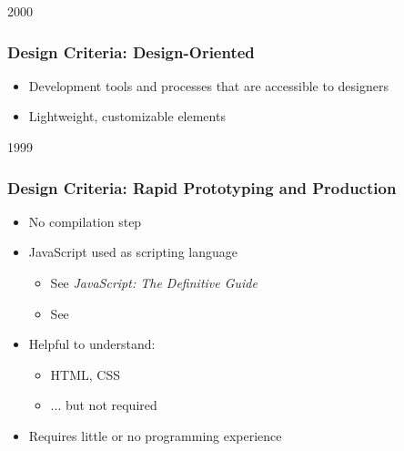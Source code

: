 
\begin{slide}{2000}\frametitle{Design Criteria: Design-Oriented}


\begin{itemize}
\item Development tools and processes that are accessible to designers
\item Lightweight, customizable elements
\end{itemize}

\end{slide}


\begin{slide}{1999}\frametitle{Design Criteria: Rapid Prototyping and Production}

\begin{itemize}
    \item No compilation step
    \item JavaScript used as scripting language
    \begin{itemize}
       \item See \emph{JavaScript: The Definitive Guide} 
       \item See 
    \end{itemize}
    \item Helpful to understand:
    \begin{itemize}
       \item HTML, CSS 
       \item ... but not required  
    \end{itemize} 
    \item Requires little or no programming experience
\end{itemize}


\end{slide}


